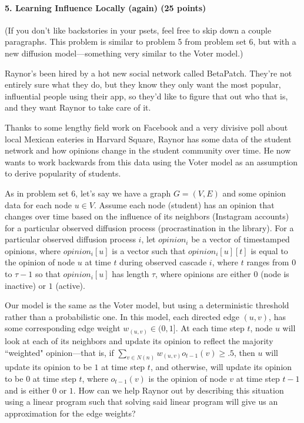 \documentclass[11pt]{article}
\begin{document}
\paragraph{5. Learning Influence Locally (again) (25 points)}
\par (If you don't like backstories in your psets, feel free to skip down a couple paragraphs. This problem is similar to problem 5 from problem set 6, but with a new diffusion model---something very similar to the Voter model.)
\par Raynor's been hired by a hot new social network called BetaPatch. They're not entirely sure what they do, but they know they only want the most popular, influential people using their app, so they'd like to figure that out who that is, and they want Raynor to take care of it.
\par Thanks to some lengthy field work on Facebook and a very divisive poll about local Mexican eateries in Harvard Square, Raynor has some data of the student network and how opinions change in the student community over time. He now wants to work backwards from this data using the Voter model as an assumption to derive popularity of students.
\par As in problem set 6, let's say we have a graph $G = (V,E)$ and some opinion data for each node $u \in V$. Assume each node (student) has an opinion that changes over time based on the influence of its neighbors (Instagram accounts) for a particular observed diffusion process (procrastination in the library). For a particular observed diffusion process $i$, let $opinion_i$ be a vector of timestamped opinions, where $opinion_i[u]$ is a vector such that $opinion_i[u][t]$ is equal to the opinion of node $u$ at time $t$ during observed cascade $i$, where $t$ ranges from $0$ to $\tau - 1$ so that $opinion_i[u]$ has length $\tau$, where opinions are either $0$ (node is inactive) or $1$ (active).
\par Our model is the same as the Voter model, but using a deterministic threshold rather than a probabilistic one. In this model, each directed edge $(u, v)$, has some corresponding edge weight $w_{(u,v)} \in (0,1]$. At each time step $t$, node $u$ will look at each of its neighbors and update its opinion to reflect the majority ``weighted" opinion---that is, if $\sum\limits_{v \in N(n)} w_{(u,v)}o_{t-1}(v) \ge .5$, then $u$ will update its opinion to be $1$ at time step $t$, and otherwise, will update its opinion to be $0$ at time step $t$, where $o_{t-1}(v)$ is the opinion of node $v$ at time step $t-1$ and is either $0$ or $1$. How can we help Raynor out by describing this situation using a linear program such that solving said linear program will give us an approximation for the edge weights? 
\end{document}
